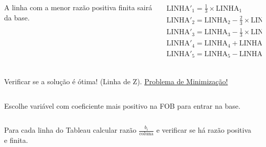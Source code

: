 \documentclass{beamer}
\begin{document}
\begin{frame}
{\begin{columns}
\begin{column}{5cm}
			\end{column}
		\end{columns}
	}	
	{
		\begin{columns}
			\begin{column}{5cm}
				\begin{mdframed}[backgroundcolor=orange!80]
					A linha com a menor razão positiva finita sairá da base.
				\end{mdframed}
			\end{column}
			\begin{column}{5cm}
				$
					\begin{matrix}
						\scriptstyle \text{LINHA}'_1 = \frac{1}{3} \times \text{LINHA}_1 \\
						\scriptstyle \text{LINHA}'_2 = \text{LINHA}_2 - \frac{2}{3} \times \text{LINHA}_1 \\
						\scriptstyle \text{LINHA}'_3 = \text{LINHA}_3 - \frac{1}{3} \times \text{LINHA}_1 \\
						\scriptstyle \text{LINHA}'_4 = \text{LINHA}_4 + \text{LINHA}_1 \\
						\scriptstyle \text{LINHA}'_5 = \text{LINHA}_5 - \text{LINHA}_1 \\
					\end{matrix}
				$
			\end{column}
		\end{columns}
	}	
	\only<5>
	{
		\begin{columns}
			\begin{column}{5cm}
				\begin{mdframed}[backgroundcolor=olive!80]
					Verificar se a solução é ótima! (Linha de Z). \underline{Problema de Minimização!}
				\end{mdframed}
			\end{column}
			\begin{column}{5cm}

			\end{column}
		\end{columns}
	}	
	\only<6>
	{
		\begin{columns}
			\begin{column}{5cm}
				\begin{mdframed}[backgroundcolor=orange!80]
					Escolhe variável com coeficiente mais positivo na FOB para entrar na base.
				\end{mdframed}
			\end{column}
			\begin{column}{5cm}

			\end{column}
		\end{columns}
	}	
	\only<7>
	{
		\begin{columns}
			\begin{column}{5cm}
				\begin{mdframed}[backgroundcolor=olive!80]
					Para cada linha do Tableau calcular razão $\frac{b_i}{\text{coluna}}$ e verificar se há razão positiva e finita.
				\end{mdframed}
			\end{column}
			\begin{column}{5cm}


\end{column}
\end{columns}}
\end{frame}
\end{document}
